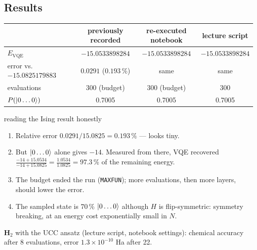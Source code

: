\documentclass[11pt,a4paper,openany]{book}
\newcounter{wex}[chapter]
\newenvironment{steps}{\begin{enumerate}[label=\textbf{Step \arabic*.}, leftmargin=4.2em, itemsep=2pt]}{\end{enumerate}}
\begin{document}
\subsection{Results}
\begin{center}\small
\begin{tabular}{lccc}
\toprule & previously recorded & re-executed notebook & lecture script\\ \midrule
$E_{\mathrm{VQE}}$ & $-15.0533898284$ & $-15.0533898284$ & $-15.0533898284$\\
error vs.\ $-15.0825179883$ & $0.0291$ ($0.193\,\%$) & same & same\\
evaluations & 300 (budget) & 300 (budget) & 300\\
$P(\ket{0\dots0})$ & 0.7005 & 0.7005 & 0.7005\\ \bottomrule
\end{tabular}
\end{center}
\begin{wexample}{reading the Ising result honestly}
\begin{steps}
\item Relative error $0.0291/15.0825 = 0.193\,\%$ --- looks tiny.
\item But $\ket{0\dots0}$ alone gives $-14$. Measured from there, VQE recovered $\frac{-14 + 15.0534}{-14 + 15.0825} = \frac{1.0534}{1.0825} = 97.3\,\%$ of the remaining energy.
\item The budget ended the run (\texttt{MAXFUN}); more evaluations, then more layers, should lower the error.
\item The sampled state is $70\,\%$ $\ket{0\dots0}$ although $H$ is flip-symmetric: symmetry breaking, at an energy cost exponentially small in $N$.
\end{steps}
\end{wexample}
\textbf{H$_2$} with the UCC ansatz (lecture script, notebook settings): chemical accuracy after 8 evaluations, error $1.3\times10^{-10}$ Ha after 22.

\end{document}
